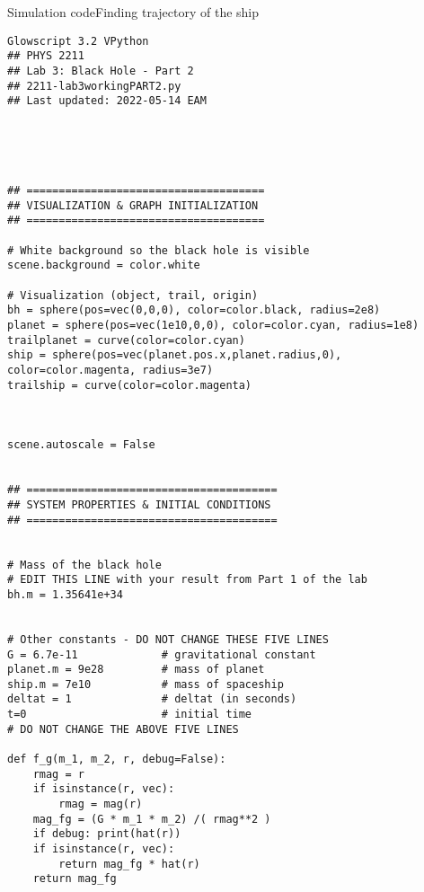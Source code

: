 \begin{frame}[fragile]{Simulation code}{Finding trajectory of the ship}
\begin{multicols}{2}
\begin{verbatim}
Glowscript 3.2 VPython
## PHYS 2211
## Lab 3: Black Hole - Part 2
## 2211-lab3workingPART2.py
## Last updated: 2022-05-14 EAM


        
        

## =====================================
## VISUALIZATION & GRAPH INITIALIZATION
## =====================================

# White background so the black hole is visible
scene.background = color.white

# Visualization (object, trail, origin)
bh = sphere(pos=vec(0,0,0), color=color.black, radius=2e8)
planet = sphere(pos=vec(1e10,0,0), color=color.cyan, radius=1e8)
trailplanet = curve(color=color.cyan)
ship = sphere(pos=vec(planet.pos.x,planet.radius,0), color=color.magenta, radius=3e7)
trailship = curve(color=color.magenta)


    
scene.autoscale = False


## =======================================
## SYSTEM PROPERTIES & INITIAL CONDITIONS 
## =======================================


# Mass of the black hole 
# EDIT THIS LINE with your result from Part 1 of the lab
bh.m = 1.35641e+34


# Other constants - DO NOT CHANGE THESE FIVE LINES
G = 6.7e-11             # gravitational constant
planet.m = 9e28         # mass of planet
ship.m = 7e10           # mass of spaceship
deltat = 1              # deltat (in seconds)
t=0                     # initial time
# DO NOT CHANGE THE ABOVE FIVE LINES

def f_g(m_1, m_2, r, debug=False):
    rmag = r
    if isinstance(r, vec):
        rmag = mag(r)
    mag_fg = (G * m_1 * m_2) /( rmag**2 )
    if debug: print(hat(r))
    if isinstance(r, vec):
        return mag_fg * hat(r)
    return mag_fg

\end{verbatim}
\end{multicols}
\end{frame}

